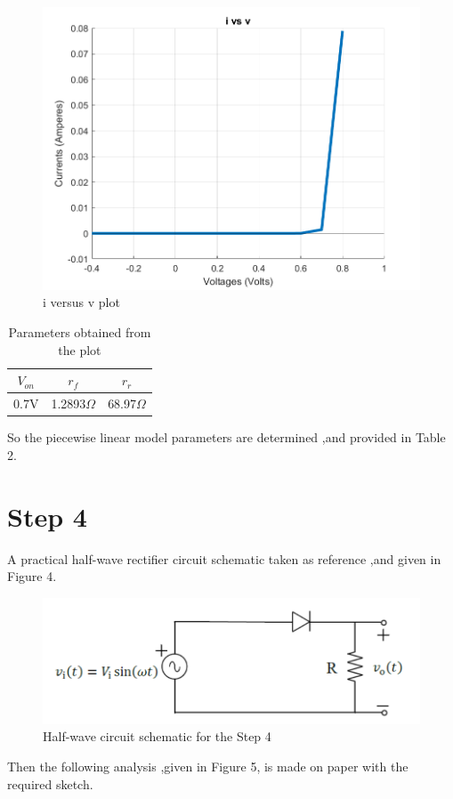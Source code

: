 \documentclass[letterpaper,12pt]{article}
\begin{document}
\begin{figure}[H]
    \centering
    \includegraphics[width=1\textwidth]{3b.png}
    \caption{i versus v plot}
\end{figure} 
\begin{table}[H]
    \begin{center}
    \caption{ Parameters obtained from the plot}
    \vspace{2mm}
    \begin{tabular}{||c | c | c ||} 
    \hline
    \(V_{on}\) &  \(r_f\) & \(r_r\)\\ [0.5ex] 
    \hline\hline
    0.7V & 1.2893\(\Omega\)  & 68.97\(\Omega\)   \\ 
    
\hline
\end{tabular}
\end{center}
\end{table}
So the piecewise linear model parameters are determined ,and provided in Table 2.

\section{Step 4}


A practical half-wave rectifier circuit schematic taken as reference ,and given in Figure 4.
\begin{figure}[H]
    \centering
   \includegraphics[width=1\textwidth]{4_1.png}
   \caption{Half-wave circuit schematic for the Step 4}
\end{figure} 
Then the following analysis ,given in Figure 5, is made on paper with the required sketch. 
\end{document}
